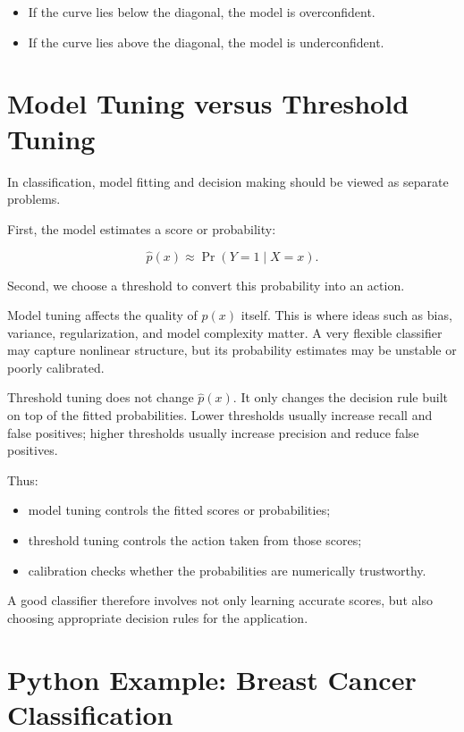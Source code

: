 \documentclass[
  letterpaper,
  DIV=11,
  numbers=noendperiod]{scrreprt}
\providecommand{\tightlist}{%
  \setlength{\itemsep}{0pt}\setlength{\parskip}{0pt}}
\theoremstyle{definition}
\theoremstyle{definition}
\theoremstyle{plain}
\theoremstyle{plain}
\theoremstyle{remark}
\begin{document}
\begin{itemize}
\tightlist
\item
  If the curve lies below the diagonal, the model is overconfident.
\item
  If the curve lies above the diagonal, the model is underconfident.
\end{itemize}

\section{Model Tuning versus Threshold
Tuning}\label{model-tuning-versus-threshold-tuning}

In classification, model fitting and decision making should be viewed as
separate problems.

First, the model estimates a score or probability:

\[
\hat p(x) \approx \Pr(Y=1\mid X=x).
\]

Second, we choose a threshold to convert this probability into an
action.

Model tuning affects the quality of \(\hat p(x)\) itself. This is where
ideas such as bias, variance, regularization, and model complexity
matter. A very flexible classifier may capture nonlinear structure, but
its probability estimates may be unstable or poorly calibrated.

Threshold tuning does not change \(\hat p(x)\). It only changes the
decision rule built on top of the fitted probabilities. Lower thresholds
usually increase recall and false positives; higher thresholds usually
increase precision and reduce false positives.

Thus:

\begin{itemize}
\tightlist
\item
  model tuning controls the fitted scores or probabilities;
\item
  threshold tuning controls the action taken from those scores;
\item
  calibration checks whether the probabilities are numerically
  trustworthy.
\end{itemize}

A good classifier therefore involves not only learning accurate scores,
but also choosing appropriate decision rules for the application.

\section{Python Example: Breast Cancer
Classification}\label{python-example-breast-cancer-classification}
\end{document}

